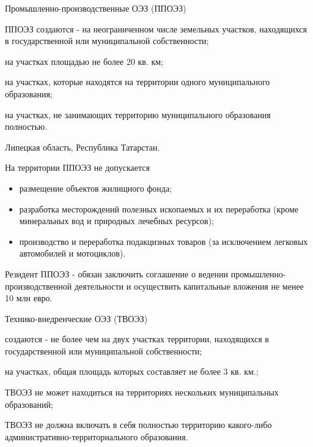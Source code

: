 \documentclass[_Venture_p3.tex]{subfiles}
\begin{document}
\begin{frame}{Промышленно-производственные ОЭЗ (ППОЭЗ)}
\begin{block}{ППОЭЗ создаются}
	\quad
	- на неограниченном числе земельных участков, находящихся в государственной или муниципальной собственности;
	
	на участках площадью не более 20 кв. км;
	
	на участках, которые находятся на территории одного муниципального образования;
	
	на участках, не занимающих территорию муниципального образования полностью.
\end{block}
Липецкая область, Республика Татарстан.
\end{frame}

\begin{frame}{На территории ППОЭЗ не допускается}{}
\begin{itemize}
	\item размещение объектов жилищного фонда;
	\item разработка месторождений полезных ископаемых и их переработка (кроме минеральных вод и природных лечебных ресурсов);
	\item производство и переработка подакцизных товаров (за исключением легковых автомобилей и мотоциклов).
\end{itemize}
\end{frame}

\begin{frame}{}
\begin{block}{Резидент ППОЭЗ}
	\quad
	- обязан заключить соглашение о ведении промышленно-производственной деятельности и осуществить капитальные вложения не менее\\ 10 млн евро.
\end{block}
\end{frame}


 

\begin{frame}{Технико-внедренческие ОЭЗ (ТВОЭЗ)}
\begin{block}{создаются }
	\quad
	- не более чем на двух участках территории, находящихся в государственной или муниципальной собственности;
	
	на участках, общая площадь которых составляет не более 3 кв. км.;
	
	ТВОЭЗ не может находиться на территориях нескольких муниципальных образований;
	
	ТВОЭЗ не должна включать в себя полностью территорию какого-либо административно-территориального образования.
\end{block}
\end{frame}
\end{document}
